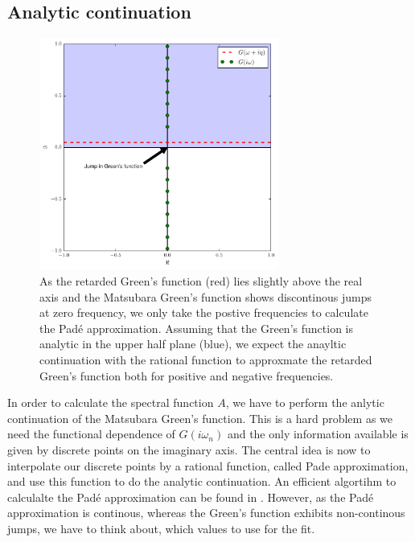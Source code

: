 \begin{appendix}
\section{Analytic continuation}
\begin{figure}[htb]
  \begin{center}
    \includegraphics[width=0.7\textwidth]{analytic_continuation}
  \end{center}
  \caption{As the retarded Green's function (red) lies slightly above the real axis and the Matsubara Green's function shows discontinous jumps at zero frequency, we only take the postive frequencies to calculate the Padé approximation. Assuming that the Green's function is analytic in the upper half plane (blue), we expect the anayltic continuation with the rational function to approxmate the retarded Green's function both for positive and negative frequencies. }
  \label{fig:analytic_continuation}
\end{figure}


In order to calculate the spectral function $A$, we have to perform the anlytic continuation of the Matsubara Green's function.
This is a hard problem as we need the functional dependence of $G(iω_n)$ and the only information available is given by discrete points on the imaginary axis.
The central idea is now to interpolate our discrete points by a rational function, called Pade approximation, and use this function to do the analytic continuation. 
An efficient algortihm to calculalte the Padé approximation can be found in \cite{padepaper}. However, as the Padé approximation is continous, whereas the Green's function exhibits non-continous jumps, we have to think about, which values to use for the fit.


\end{appendix}
